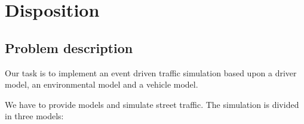 \documentclass[a4paper,10pt,titlepage]{article}
\begin{document}


\tableofcontents


\newpage

\section{Disposition}

\subsection{Problem description}
Our task is to implement an event driven traffic simulation based upon a driver model, an environmental model and a vehicle model.

We have to provide models and simulate street traffic. 
The simulation is divided in three models:

\end{document}
